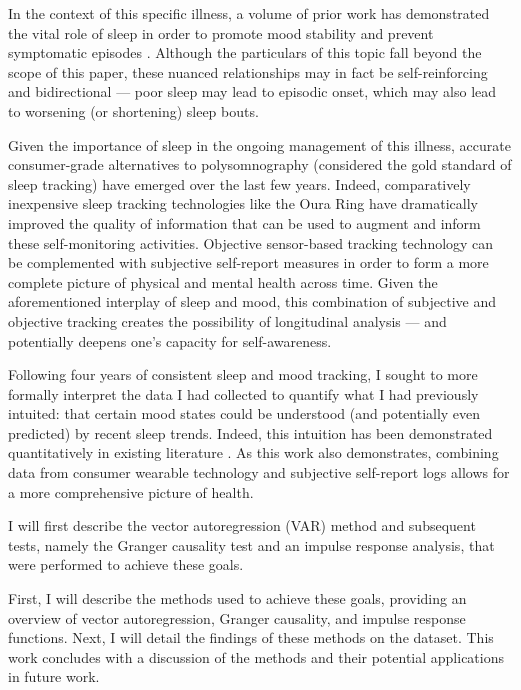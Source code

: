 \documentclass{article}
\begin{document}
In the context of this specific illness, a volume of prior work has demonstrated
the vital role of sleep in order to promote mood stability and prevent
symptomatic episodes
\citep{harveySleep2009,murrayCircadian2010,gruberSleep2011}. Although the
particulars of this topic fall beyond the scope of this paper, these nuanced
relationships may in fact be self-reinforcing and bidirectional --- poor sleep
may lead to episodic onset, which may also lead to worsening (or shortening)
sleep bouts.

Given the importance of sleep in the ongoing management of this illness,
accurate consumer-grade alternatives to polysomnography (considered the gold
standard of sleep tracking) have emerged over the last few years. Indeed,
comparatively inexpensive sleep tracking technologies like the Oura Ring have
dramatically improved the quality of information that can be used to augment and
inform these self-monitoring activities. Objective sensor-based tracking
technology can be complemented with subjective self-report measures in order to
form a more complete picture of physical and mental health across time. Given
the aforementioned interplay of sleep and mood, this combination of subjective
and objective tracking creates the possibility of longitudinal analysis --- and
potentially deepens one's capacity for self-awareness.

Following four years of consistent sleep and mood tracking, I sought to more
formally interpret the data I had collected to quantify what I had previously
intuited: that certain mood states could be understood (and potentially even
predicted) by recent sleep trends. Indeed, this intuition has been demonstrated
quantitatively in existing literature \citep{boseVector2017,
moshePredicting2021, jafarlouObjective2023}. As this work also demonstrates,
combining data from consumer wearable technology and subjective self-report logs
allows for a more comprehensive picture of health.

I will first describe the vector autoregression (VAR) method and subsequent
tests, namely the Granger causality test and an impulse response analysis, that
were performed to achieve these goals.

First, I will describe the methods used to achieve these goals, providing an
overview of vector autoregression, Granger causality, and impulse response
functions. Next, I will detail the findings of these methods on the dataset.
This work concludes with a discussion of the methods and their potential
applications in future work.
\end{document}
